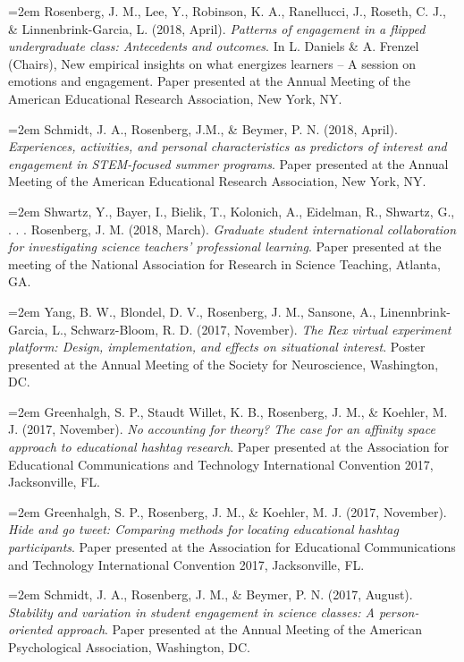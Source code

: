 \documentclass[]{article}
\begin{document}
\hangindent=2em Rosenberg, J. M., Lee, Y., Robinson, K. A., Ranellucci,
J., Roseth, C. J., \& Linnenbrink-Garcia, L. (2018, April).
\emph{Patterns of engagement in a flipped undergraduate class:
Antecedents and outcomes}. In L. Daniels \& A. Frenzel (Chairs), New
empirical insights on what energizes learners -- A session on emotions
and engagement. Paper presented at the Annual Meeting of the American
Educational Research Association, New York, NY.

\hangindent=2em Schmidt, J. A., Rosenberg, J.M., \& Beymer, P. N. (2018,
April). \emph{Experiences, activities, and personal characteristics as
predictors of interest and engagement in STEM-focused summer programs}.
Paper presented at the Annual Meeting of the American Educational
Research Association, New York, NY.

\hangindent=2em Shwartz, Y., Bayer, I., Bielik, T., Kolonich, A.,
Eidelman, R., Shwartz, G., . . . Rosenberg, J. M. (2018, March).
\emph{Graduate student international collaboration for investigating
science teachers' professional learning}. Paper presented at the meeting
of the National Association for Research in Science Teaching, Atlanta,
GA.

\hangindent=2em Yang, B. W., Blondel, D. V., Rosenberg, J. M., Sansone,
A., Linennbrink-Garcia, L., Schwarz-Bloom, R. D. (2017, November).
\emph{The Rex virtual experiment platform: Design, implementation, and
effects on situational interest}. Poster presented at the Annual Meeting
of the Society for Neuroscience, Washington, DC.

\hangindent=2em Greenhalgh, S. P., Staudt Willet, K. B., Rosenberg, J.
M., \& Koehler, M. J. (2017, November). \emph{No accounting for theory?
The case for an affinity space approach to educational hashtag
research}. Paper presented at the Association for Educational
Communications and Technology International Convention 2017,
Jacksonville, FL.

\hangindent=2em Greenhalgh, S. P., Rosenberg, J. M., \& Koehler, M. J.
(2017, November). \emph{Hide and go tweet: Comparing methods for
locating educational hashtag participants}. Paper presented at the
Association for Educational Communications and Technology International
Convention 2017, Jacksonville, FL.

\hangindent=2em Schmidt, J. A., Rosenberg, J. M., \& Beymer, P. N.
(2017, August). \emph{Stability and variation in student engagement in
science classes: A person-oriented approach}. Paper presented at the
Annual Meeting of the American Psychological Association, Washington,
DC.
\end{document}
